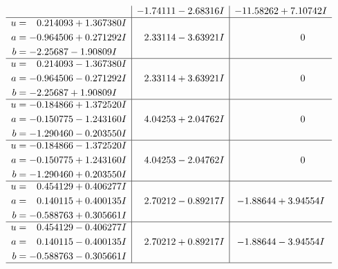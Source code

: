 \documentclass[1p]{elsarticle_modified}
\theoremstyle{definition}
\begin{document}
$$\begin{array}{c|c|c}
 & -1.74111 - 2.68316 I & -11.58262 + 7.10742 I \\ \hline\begin{aligned}
u &= \phantom{-}0.214093 + 1.367380 I \\
a &= -0.964506 + 0.271292 I \\
b &= -2.25687 - 1.90809 I\end{aligned}
 & \phantom{-}2.33114 - 3.63921 I & \phantom{-0.000000 } 0 \\ \hline\begin{aligned}
u &= \phantom{-}0.214093 - 1.367380 I \\
a &= -0.964506 - 0.271292 I \\
b &= -2.25687 + 1.90809 I\end{aligned}
 & \phantom{-}2.33114 + 3.63921 I & \phantom{-0.000000 } 0 \\ \hline\begin{aligned}
u &= -0.184866 + 1.372520 I \\
a &= -0.150775 - 1.243160 I \\
b &= -1.290460 - 0.203550 I\end{aligned}
 & \phantom{-}4.04253 + 2.04762 I & \phantom{-0.000000 } 0 \\ \hline\begin{aligned}
u &= -0.184866 - 1.372520 I \\
a &= -0.150775 + 1.243160 I \\
b &= -1.290460 + 0.203550 I\end{aligned}
 & \phantom{-}4.04253 - 2.04762 I & \phantom{-0.000000 } 0 \\ \hline\begin{aligned}
u &= \phantom{-}0.454129 + 0.406277 I \\
a &= \phantom{-}0.140115 + 0.400135 I \\
b &= -0.588763 + 0.305661 I\end{aligned}
 & \phantom{-}2.70212 - 0.89217 I & -1.88644 + 3.94554 I \\ \hline\begin{aligned}
u &= \phantom{-}0.454129 - 0.406277 I \\
a &= \phantom{-}0.140115 - 0.400135 I \\
b &= -0.588763 - 0.305661 I\end{aligned}
 & \phantom{-}2.70212 + 0.89217 I & -1.88644 - 3.94554 I\\
 \hline 
 \end{array}$$\newpage$$\begin{array}{c|c|c}  

\end{array}$$
\end{document}
